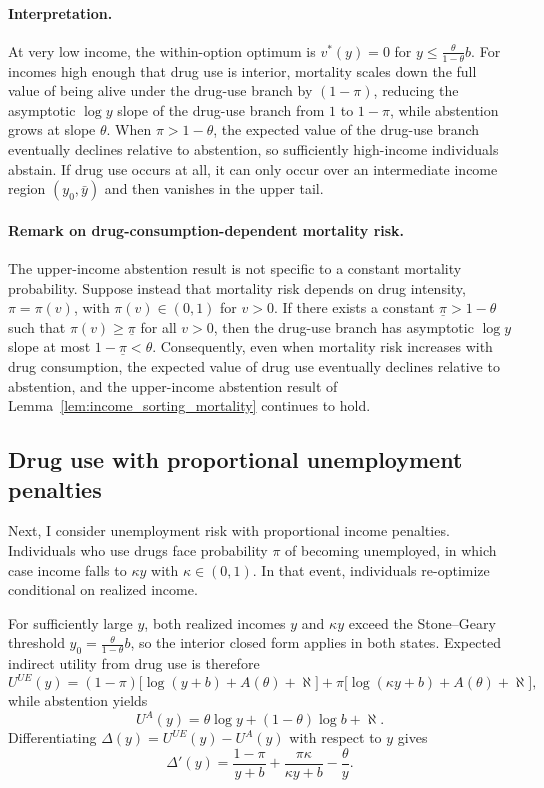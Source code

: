\paragraph{Interpretation.}
At very low income, the within-option optimum is $v^*(y)=0$ for $y\le \frac{\theta}{1-\theta}b$. For incomes high enough that drug use is interior, mortality scales down the full value of being alive under the drug-use branch by $(1-\pi)$, reducing the asymptotic $\log y$ slope of the drug-use branch from $1$ to $1-\pi$, while abstention grows at slope $\theta$. When $\pi>1-\theta$, the expected value of the drug-use branch eventually declines relative to abstention, so sufficiently high-income individuals abstain. If drug use occurs at all, it can only occur over an intermediate income region $(y_0,\bar y)$ and then vanishes in the upper tail.

\paragraph{Remark on drug-consumption-dependent mortality risk.}
The upper-income abstention result is not specific to a constant mortality probability. Suppose instead that mortality risk depends on drug intensity, $\pi=\pi(v)$, with $\pi(v)\in(0,1)$ for $v>0$. If there exists a constant $\underline{\pi}>1-\theta$ such that $\pi(v)\ge \underline{\pi}$ for all $v>0$, then the drug-use branch has asymptotic $\log y$ slope at most $1-\underline{\pi}<\theta$. Consequently, even when mortality risk increases with drug consumption, the expected value of drug use eventually declines relative to abstention, and the upper-income abstention result of Lemma~\ref{lem:income_sorting_mortality} continues to hold.

\subsection{Drug use with proportional unemployment penalties}

Next, I consider unemployment risk with proportional income penalties. Individuals who use drugs face probability $\pi$ of becoming unemployed, in which case income falls to $\kappa y$ with $\kappa\in(0,1)$. In that event, individuals re-optimize conditional on realized income.

For sufficiently large $y$, both realized incomes $y$ and $\kappa y$ exceed the Stone--Geary threshold $y_0=\frac{\theta}{1-\theta}b$, so the interior closed form applies in both states. Expected indirect utility from drug use is therefore
\[
U^{UE}(y)=(1-\pi)\big[\log(y+b)+A(\theta)+\aleph\big]
+\pi\big[\log(\kappa y+b)+A(\theta)+\aleph\big],
\]
while abstention yields
\[
U^{A}(y)=\theta\log y+(1-\theta)\log b + \aleph.
\]
Differentiating $\Delta(y)=U^{UE}(y)-U^{A}(y)$ with respect to $y$ gives
\[
\Delta'(y)=\frac{1-\pi}{y+b}+\frac{\pi\kappa}{\kappa y+b}-\frac{\theta}{y}.
\]

